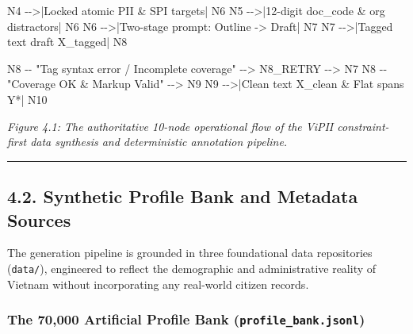 \documentclass[
]{article}
\newenvironment{Shaded}{}{}
\newcommand{\NormalTok}[1]{#1}
\begin{document}
\begin{Shaded}
\begin{Highlighting}[]
\NormalTok{    N4 {-}{-}\textgreater{}|Locked atomic PII \& SPI targets| N6}
\NormalTok{    N5 {-}{-}\textgreater{}|12{-}digit doc\_code \& org distractors| N6}
\NormalTok{    N6 {-}{-}\textgreater{}|Two{-}stage prompt: Outline {-}\textgreater{} Draft| N7}
\NormalTok{    N7 {-}{-}\textgreater{}|Tagged text draft X\_tagged| N8}

\NormalTok{    N8 {-}{-} "Tag syntax error / Incomplete coverage" {-}{-}\textgreater{} N8\_RETRY {-}{-}\textgreater{} N7}
\NormalTok{    N8 {-}{-} "Coverage OK \& Markup Valid" {-}{-}\textgreater{} N9}
\NormalTok{    N9 {-}{-}\textgreater{}|Clean text X\_clean \& Flat spans Y*| N10}
\end{Highlighting}
\end{Shaded}

\emph{Figure 4.1: The authoritative 10-node operational flow of the
ViPII constraint-first data synthesis and deterministic annotation
pipeline.}

\begin{center}\rule{0.5\linewidth}{0.5pt}\end{center}

\subsection{4.2. Synthetic Profile Bank and Metadata
Sources}\label{synthetic-profile-bank-and-metadata-sources}

The generation pipeline is grounded in three foundational data
repositories (\texttt{data/}), engineered to reflect the demographic and
administrative reality of Vietnam without incorporating any real-world
citizen records.

\subsubsection{\texorpdfstring{The 70,000 Artificial Profile Bank
(\texttt{profile\_bank.jsonl})}{The 70,000 Artificial Profile Bank (profile\_bank.jsonl)}}\label{the-70000-artificial-profile-bank-profile_bank.jsonl}
\end{document}
